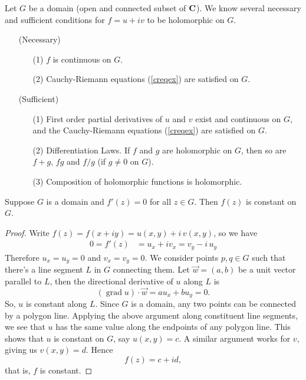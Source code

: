 \begin{discussion}
Let $G$ be a domain (open and connected subset of $\mathbf C$). We know several necessary and sufficient conditions for $f = u + iv$ to be holomorphic on $G$. 
\begin{itemize}[leftmargin = 6em]
\item[(Necessary)]
\begin{itemize}
\item[(1)] $f$ is continuous on $G$.
\item[(2)] Cauchy-Riemann equations (\ref{creqex}) are satisfied on $G$.
\end{itemize}
\item[(Sufficient)]
\begin{itemize}
\item[(1)] First order partial derivatives of $u$ and $v$ exist and continuous on $G$, and the Cauchy-Riemann equations (\ref{creqex}) are satisfied on $G$.
\item[(2)] Differentiation Laws. If $f$ and $g$ are holomorphic on $G$, then so are $f + g,\, fg$ and $f/g$ (if $g \neq 0$ on $G$).
\item[(3)] Composition of holomorphic functions is holomorphic.
\end{itemize}
\end{itemize}
\end{discussion}

\vspace*{1em}

\begin{theorem}\label{der0const}
Suppose $G$ is a domain and $f'(z) = 0$ for all $z \in G$. Then $f(z)$ is constant on $G$.
\end{theorem}
\begin{proof}
Write $f(z) = f(x + iy) = u(x,y) + i\,v(x,y)$, so we have
\begin{align*}
0 = f'(z) &= u_x + iv_x = v_y - i\,u_y
\end{align*}
Therefore $u_x = u_y = 0$ and $v_x = v_y = 0$. We consider points $p,q \in G$ such that there's a line segment $L$ in $G$ connecting them. Let $\vec{w} = (a,b)$ be a unit vector parallel to $L$, then the directional derivative of $u$ along $L$ is
\[(\operatorname{grad}u)\cdot\vec{w} = au_x + bu_y = 0.\]
So, $u$ is constant along $L$. Since $G$ is a domain, any two points can be connected by a polygon line. Applying the above argument along constituent line segments, we see that $u$ has the same value along the endpoints of any polygon line. This shows that $u$ is constant on $G$, say $u(x,y) = c$. A similar argument works for $v$, giving us $v(x,y) = d$. Hence
\[f(z) = c + id,\]
that is, $f$ is constant.
\end{proof}

